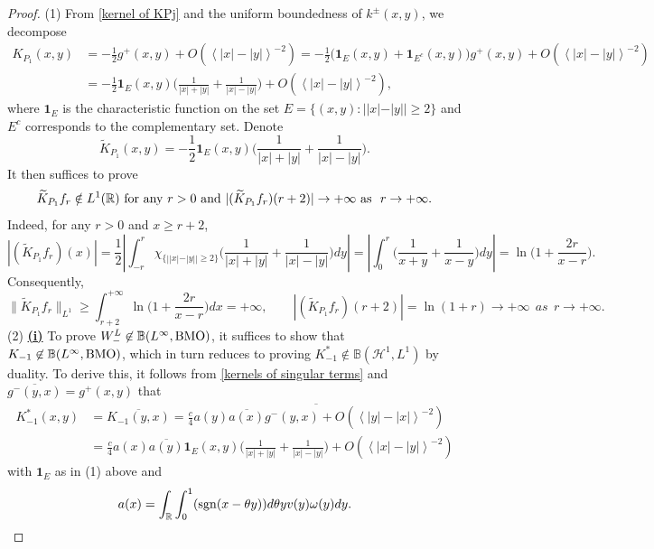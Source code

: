 \documentclass[reqno]{amsart}
\newcommand\R{\mathbb{R}}
\newcommand\B{\mathbb{B}}
\newcommand\HH{\mathcal{H}}
\numberwithin{equation}{section}
\begin{document}
\begin{proof}
(1) From \eqref{kernel of KPj} and the uniform boundedness of $k^{\pm}(x,y)$, we decompose
\begin{align*}
K_{P_1}(x,y)&=-\frac{1}{2}g^{+}(x,y)+O(\left<|x|-|y|\right>^{-2})=-\frac{1}{2}\Big(\mathbf1_E(x,y)+\mathbf1_{E^c}(x,y)\Big)g^{+}(x,y)+O(\left<|x|-|y|\right>^{-2})\\
&=-\frac{1}{2}\mathbf1_E(x,y)\Big(\frac{1}{|x|+|y|}+\frac{1}{|x|-|y|}\Big)+O(\left<|x|-|y|\right>^{-2}),
\end{align*}
where $\mathbf1_E$ is the characteristic function on the set $E=\{(x,y):||x|-|y||\geq2\}$ and $E^c$ corresponds to the complementary set. Denote $$\widetilde{K}_{P_1}(x,y)=-\frac{1}{2}\mathbf1_E(x,y)\big(\frac{1}{|x|+|y|}+\frac{1}{|x|-|y|}\big).$$ It then suffices to prove
$${\widetilde{K}_{P_1}}f_{r}\notin L^1(\R)\ {\rm for\ any}\ r>0\ {\rm and}\  |(\widetilde{K}_{P_1}f_{r})(r+2)|\rightarrow+\infty\ {\rm as}\ \ r\rightarrow +\infty.$$
Indeed, for any $r>0$ and $x\geq r+2$, 
\begin{equation*}
|(\widetilde{K}_{P_1}f_{r})(x)|=\frac{1}{2}\left|\int_{-r}^{r}\chi_{\{||x|-|y||\geq2\}}\Big(\frac{1}{|x|+|y|}+\frac{1}{|x|-|y|}\Big)dy\right|=\left|\int_{0}^{r}\Big(\frac{1}{x+y}+\frac{1}{x-y}\Big)dy\right|=\ln\Big(1+\frac{2r}{x-r}\Big).
\end{equation*}
Consequently,
\begin{equation*}
\|\widetilde{K}_{P_1}f_{r}\|_{L^1}\geq
\int_{r+2}^{+\infty}\ln\Big(1+\frac{2r}{x-r}\Big)dx=+\infty,\qquad
|(\widetilde{K}_{P_1}f_{r})(r+2)|=\ln(1+r)\rightarrow
+\infty\ \  as\ \ r\rightarrow+\infty.
\end{equation*}
\vskip0.3cm
(2) \underline{\bf(i)} To prove $W^L_{-}\not\in\B(L^{\infty},{\rm BMO})$, it suffices to show that $K_{-1}\not\in\B(L^{\infty},{\rm BMO})$, which in turn reduces to
proving $K^*_{-1}\not\in\B(\HH^1,L^1)$ by duality. To derive this, it follows from \eqref{kernels of singular terms} and $\overline{g^{-}(y,x)}=g^+(x,y)$ that
\begin{align*}
K^*_{-1}(x,y)&=\overline{K_{-1}(y,x)}=\overline{\frac{c}{4}a(y)\overline{a(x)}g^{-}(y,x)+O(\left<|y|-|x|\right>^{-2})}\\
&=\frac{c}{4}{a(x)}\overline{a(y)}\mathbf1_E(x,y)\Big(\frac{1}{|x|+|y|}+\frac{1}{|x|-|y|}\Big)+O(\left<|x|-|y|\right>^{-2})
\end{align*}
with $\mathbf1_E$ as in (1) above and 
\begin{equation*}
    a(x)=\int_{\R}\int_{0}^{1}({\rm sgn}(x-\theta y))d\theta yv(y)\omega(y)dy.

\end{equation*}
\end{proof}
\end{document}
